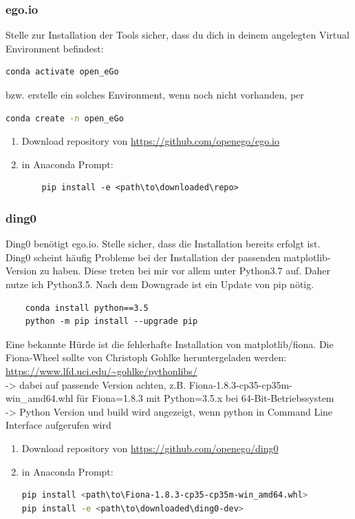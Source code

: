 \documentclass[
a4paper,     %
12pt         %
]{scrartcl}  %
\begin{document}
\subsubsection{ego.io}
Stelle zur Installation der Tools sicher, dass du dich in deinem angelegten Virtual Environment befindest:
\begin{lstlisting}[language=bash]
	conda activate open_eGo
\end{lstlisting}
bzw. erstelle ein solches Environment, wenn noch nicht vorhanden, per
\begin{lstlisting}[language=bash]
	conda create -n open_eGo
\end{lstlisting}
\begin{enumerate}
	\item Download repository von \url{https://github.com/openego/ego.io}
	\item in Anaconda Prompt:
\begin{lstlisting}
	pip install -e <path\to\downloaded\repo>
\end{lstlisting}
\end{enumerate}

\subsubsection{ding0}
Ding0 benötigt ego.io. Stelle sicher, dass die Installation bereits erfolgt ist.\\
Ding0 scheint häufig Probleme bei der Installation der passenden matplotlib-Version zu haben. Diese treten bei mir vor allem unter Python3.7 auf. Daher nutze ich Python3.5. Nach dem Downgrade ist ein Update von pip nötig.
\begin{lstlisting}
	conda install python==3.5
	python -m pip install --upgrade pip
\end{lstlisting}

Eine bekannte Hürde ist die fehlerhafte Installation von matplotlib/fiona. Die Fiona-Wheel sollte von Christoph Gohlke heruntergeladen werden: \url{https://www.lfd.uci.edu/~gohlke/pythonlibs/}
\\-> dabei auf passende Version achten, z.B. Fiona-1.8.3-cp35-cp35m-win\_amd64.whl für Fiona=1.8.3 mit Python=3.5.x bei 64-Bit-Betriebssystem
\\-> Python Version und build wird angezeigt, wenn python in Command Line Interface aufgerufen wird
\begin{enumerate}
	\item Download repository von \url{https://github.com/openego/ding0}
	\item in Anaconda Prompt:
\begin{lstlisting}[language=bash]
pip install <path\to\Fiona-1.8.3-cp35-cp35m-win_amd64.whl>
pip install -e <path\to\downloaded\ding0-dev>
\end{lstlisting}
\end{enumerate}
\end{document}
